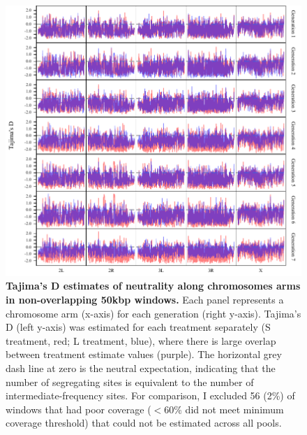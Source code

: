 \begin{figure}[!htb]
    \centering
    \includegraphics[width=1\textwidth]{Supp/Chp4_DNA/TajimasD_Chrom.pdf}
\caption[Tajima’s D estimates of neutrality along chromosomes arms in non-overlapping 50kbp windows. ]{\textbf{Tajima’s D estimates of neutrality along chromosomes arms in non-overlapping 50kbp windows.} Each panel represents a chromosome arm (x-axis) for each generation (right y-axis). Tajima’s D (left y-axis) was estimated for each treatment separately (S treatment, red; L treatment, blue), where there is large overlap between treatment estimate values (purple). The horizontal grey dash line at zero is the neutral expectation, indicating that the number of segregating sites is equivalent to the number of intermediate-frequency sites. For comparison, I excluded 56 (2\%) of windows that had poor coverage ($< 60\%$ did not meet minimum coverage threshold) that could not be estimated across all pools.}
    \label{fig:DNAsuppTajD}
\end{figure}

\FloatBarrier

